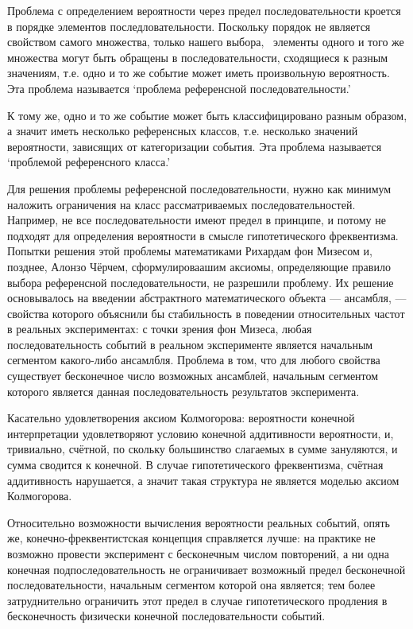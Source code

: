 \documentclass[14pt]{extarticle}
\begin{document}
Проблема с определением вероятности через предел последовательности кроется в порядке элементов последловательности. Поскольку порядок не является свойством самого множества, только нашего выбора,~\cite{Russell} элементы одного и того же множества могут быть обращены в последовательности, сходящиеся к разным значениям, т.е. одно и то же событие может иметь произвольную вероятность. Эта проблема называется `проблема референсной последовательности.'

К тому же, одно и то же событие может быть классифицировано разным образом, а значит иметь несколько референсных классов, т.е. несколько значений вероятности, зависящих от категоризации события. Эта проблема называется `проблемой референсного класса.'

Для решения проблемы референсной последовательности, нужно как минимум наложить ограничения на класс рассматриваемых последовательностей. Например, не все последовательности имеют предел в принципе, и потому не подходят для определения вероятности в смысле гипотетического фреквентизма. Попытки решения этой проблемы математиками Рихардам фон Мизесом и, позднее, Алонзо Чёрчем, сформулироваашим аксиомы, определяющие правило выбора референсной последовательности, не разрешили проблему. Их решение основывалось на введении абстрактного математического объекта --- ансамбля, --- свойства которого объяснили бы стабильность в поведении относительных частот в реальных экспериментах: с точки зрения фон Мизеса, любая последовательность событий в реальном эксперименте является начальным сегментом какого-либо ансамлбля. Проблема в том, что для любого свойства существует бесконечное число возможных ансамблей, начальным сегментом которого является данная последовательность результатов эксперимента.


Касательно удовлетворения аксиом Колмогорова: вероятности конечной интерпретации удовлетворяют условию конечной аддитивности вероятности, и, тривиально, счётной, по скольку большинство слагаемых в сумме зануляются, и сумма сводится к конечной. В случае гипотетического фреквентизма, счётная аддитивность нарушается, а значит такая структура не является моделью аксиом Колмогорова.

Относительно возможности вычисления вероятности реальных событий, опять же, конечно-фреквентистская концепция справляется лучше: на практике не возможно провести эксперимент с бесконечным числом повторений, а ни одна конечная подпоследовательность не ограничивает возможный предел бесконечной последовательности, начальным сегментом которой она является; тем более затруднительно ограничить этот предел в случае гипотетического продления в бесконечность физически конечной последовательности событий.
\end{document}

